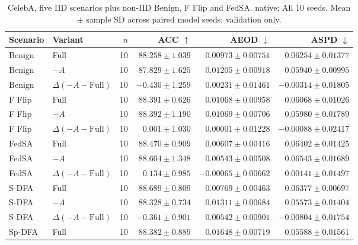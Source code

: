 \begin{table}[t]
\centering
\small
\caption{CelebA, five IID scenarios plus non-IID Benign, F Flip and FedSA. native; All 10 seeds. Mean $\pm$ sample SD across paired model seeds; validation only.}
\begin{tabular}{llrrrr}
\toprule
Scenario & Variant & $n$ & ACC $\uparrow$ & AEOD $\downarrow$ & ASPD $\downarrow$ \\
\midrule
Benign & Full & 10 & $88.258 \pm 1.039$ & $0.00973 \pm 0.00751$ & $0.06254 \pm 0.01377$ \\
Benign & $-A$ & 10 & $87.829 \pm 1.625$ & $0.01205 \pm 0.00918$ & $0.05940 \pm 0.00995$ \\
Benign & $\Delta(-A-\mathrm{Full})$ & 10 & $-0.430 \pm 1.259$ & $0.00231 \pm 0.01461$ & $-0.00314 \pm 0.01805$ \\
F Flip & Full & 10 & $88.391 \pm 0.626$ & $0.01068 \pm 0.00958$ & $0.06068 \pm 0.01026$ \\
F Flip & $-A$ & 10 & $88.392 \pm 1.190$ & $0.01069 \pm 0.00706$ & $0.05980 \pm 0.01789$ \\
F Flip & $\Delta(-A-\mathrm{Full})$ & 10 & $0.001 \pm 1.030$ & $0.00001 \pm 0.01228$ & $-0.00088 \pm 0.02417$ \\
FedSA & Full & 10 & $88.470 \pm 0.909$ & $0.00607 \pm 0.00416$ & $0.06402 \pm 0.01425$ \\
FedSA & $-A$ & 10 & $88.604 \pm 1.348$ & $0.00543 \pm 0.00508$ & $0.06543 \pm 0.01689$ \\
FedSA & $\Delta(-A-\mathrm{Full})$ & 10 & $0.134 \pm 0.985$ & $-0.00065 \pm 0.00662$ & $0.00141 \pm 0.01497$ \\
S-DFA & Full & 10 & $88.689 \pm 0.809$ & $0.00769 \pm 0.00463$ & $0.06377 \pm 0.00697$ \\
S-DFA & $-A$ & 10 & $88.328 \pm 0.734$ & $0.01311 \pm 0.00684$ & $0.05573 \pm 0.01404$ \\
S-DFA & $\Delta(-A-\mathrm{Full})$ & 10 & $-0.361 \pm 0.901$ & $0.00542 \pm 0.00901$ & $-0.00804 \pm 0.01754$ \\
Sp-DFA & Full & 10 & $88.382 \pm 0.889$ & $0.01648 \pm 0.00719$ & $0.05588 \pm 0.01561$ \\

\end{tabular}
\end{table}
